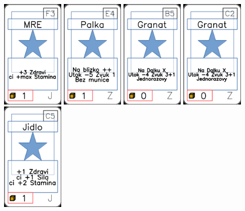\documentclass[a4paper]{article}
\begin{document}
	\includegraphics[width=3.0cm]{img-1_27}
	\includegraphics[width=3.0cm]{img-1_83}
	\includegraphics[width=3.0cm]{img-1_99}
	\includegraphics[width=3.0cm]{img-1_101}
	\includegraphics[width=3.0cm]{img-1_14}
\end{document}
